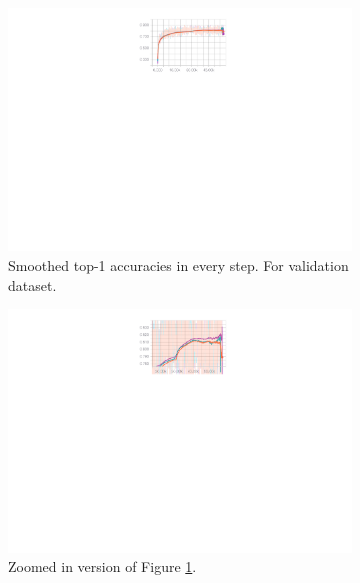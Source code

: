 \begin{figure}[h]
  \vspace{-45px}
  \centering
  \begin{subfigure}{.79\textwidth}
        \includegraphics[width=1\linewidth]{images/convolution-comparison-test-dataset-full-accuracy.pdf}
        \caption{Smoothed top-1 accuracies in every step. For validation dataset.}
        \label{fig:conv-comparison-full}
  \end{subfigure}
  \begin{subfigure}{.79\textwidth}
        \includegraphics[width=1\linewidth]{images/convolution-comparison-test-dataset-accuracy-zoomed.pdf}
        \caption{Zoomed in version of Figure \ref{fig:conv-comparison-full}.}
  \end{subfigure}
  \begin{subfigure}{.49\textwidth}

\end{subfigure}
\end{figure}
